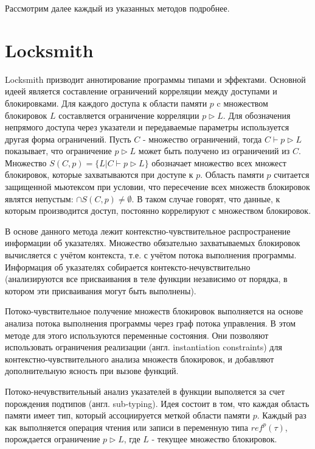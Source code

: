 Рассмотрим далее каждый из указанных методов подробнее.

\section{Locksmith}

Locksmith призводит аннотирование программы типами и эффектами. Основной идеей является составление ограничений корреляции между доступами и блокировками. Для каждого доступа к области памяти $p$ c множеством блокировок $L$ составляется ограничение корреляции $p \triangleright L$. Для обозначения непрямого доступа через указатели и передаваемые параметры используется другая форма ограничений. Пусть $C$ - множество ограничений, тогда $C \vdash p \triangleright L$ показывает, что ограничение $p \triangleright L$ может быть получено из ограничений из $C$. Множество $S(C, p) = \{L | C \vdash p \triangleright L\}$ обозначает множество всех множест блокировок, которые захватываются при доступе к $p$. Область памяти $p$ считается защищенной мьютексом при условии, что пересечение всех множеств блокировок являтся непустым: $\cap S(C, p) \neq \emptyset$. В таком случае говорят, что данные, к которым производится доступ, постоянно коррелируют с множеством блокировок.

В основе данного метода лежит контекстно-чувствительное распространение информации об указателях. Множество обязательно захватываемых блокировок вычисляется с учётом контекста, т.е. с учётом потока выполнения программы. Информация об указателях собирается контексто-нечувствительно (анализируются все присваивания в теле функции независимо от порядка, в котором эти присваивания могут быть выполнены). 

Потоко-чувствительное получение множеств блокировок выполняется на основе анализа потока выполнения программы через граф потока управления. В этом методе для этого используются переменные состояния. Они позволяют использовать ограничения реализации (англ. instantiation constraints) для контекстно-чувствительного анализа множеств блокировок, и добавляют дополнительную ясность при вызове функций.

Потоко-нечувствительный анализ указателей в функции выполяется за счет порождения подтипов (англ. sub-typing). Идея состоит в том, что каждая область памяти имеет тип, который ассоциируется меткой области памяти $p$. Каждый раз как выполняется операция чтения или записи в переменную типа $ref^{p}(\tau)$, порождается ограничение $p \triangleright L$, где $L$ - текущее множество блокировок.

